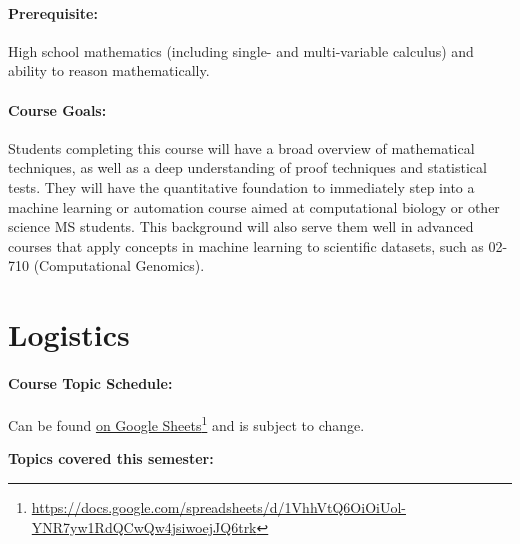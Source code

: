 \documentclass[12pt]{scrartcl}
\begin{document}

\paragraph{Prerequisite:} 
High school mathematics (including single- and multi-variable calculus) and ability to reason mathematically.

\paragraph{Course Goals:} 
Students completing this course will have a broad overview of mathematical techniques, 
as well as a deep understanding of proof techniques and statistical tests. 
They will have the quantitative foundation to immediately step into a machine learning or 
automation course aimed at computational biology or other science MS students. 
This background will also serve them well in advanced courses that apply concepts in machine learning 
to scientific datasets, such as 02-710 (Computational Genomics).

\clearpage
\tableofcontents





\clearpage
\section{Logistics}

\paragraph{Course Topic Schedule:} Can be found \href{https://docs.google.com/spreadsheets/d/1VhhVtQ6OiOiUol-YNR7yw1RdQCwQw4jsiwoejJQ6trk}{on Google Sheets}\footnote{\url{https://docs.google.com/spreadsheets/d/1VhhVtQ6OiOiUol-YNR7yw1RdQCwQw4jsiwoejJQ6trk}}
and is subject to change.


\textbf{Topics covered this semester:}
\end{document}
